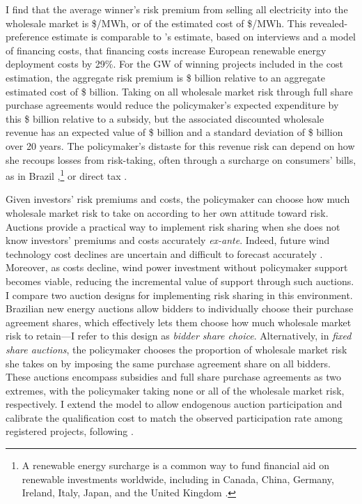 \documentclass[12pt]{article}
\theoremstyle{definition} %
\begin{document}
I find that the average winner's risk premium from selling all electricity into the wholesale market is \$/MWh, or  of the estimated cost of \$/MWh. This revealed-preference estimate is comparable to \citet{May2021}'s estimate, based on interviews and a model of financing costs, that financing costs increase European renewable energy deployment costs by 29\%. For the  GW of winning projects included in the cost estimation, the aggregate risk premium is \$ billion relative to an aggregate estimated cost of \$ billion. Taking on all wholesale market risk through full share purchase agreements would reduce the policymaker's expected expenditure by this \$ billion relative to a subsidy, but the associated discounted wholesale revenue has an expected value of \$ billion and a standard deviation of \$ billion over 20 years. The policymaker's distaste for this revenue risk can depend on how she recoups losses from risk-taking, often through a surcharge on consumers' bills, as in Brazil \citep{Tolmasquim2021},\footnote{
A renewable energy surcharge is a common way to fund financial aid on renewable investments worldwide, including in Canada, China, Germany, Ireland, Italy, Japan, and the United Kingdom \citep{Ming2013,Ansarin2022}.
} or direct tax \citep{Beiter2024}.

Given investors' risk premiums and costs, the policymaker can choose how much wholesale market risk to take on according to her own attitude toward risk. Auctions provide a practical way to implement risk sharing when she does not know investors' premiums and costs accurately \textit{ex-ante}. Indeed, future wind technology cost declines are uncertain and difficult to forecast accurately \citep{Wiser2021}. Moreover, as costs decline, wind power investment without policymaker support becomes viable, reducing the incremental value of support through such auctions. I compare two auction designs for implementing risk sharing in this environment. Brazilian new energy auctions allow bidders to individually choose their purchase agreement shares, which effectively lets them choose how much wholesale market risk to retain---I refer to this design as \textit{bidder share choice}. Alternatively, in \textit{fixed share auctions}, the policymaker chooses the proportion of wholesale market risk she takes on by imposing the same purchase agreement share on all bidders. These auctions encompass subsidies and full share purchase agreements as two extremes, with the policymaker taking none or all of the wholesale market risk, respectively. I extend the model to allow endogenous auction participation and calibrate the qualification cost to match the observed participation rate among registered projects, following \citet{Bolotnyy2023}.
\end{document}
